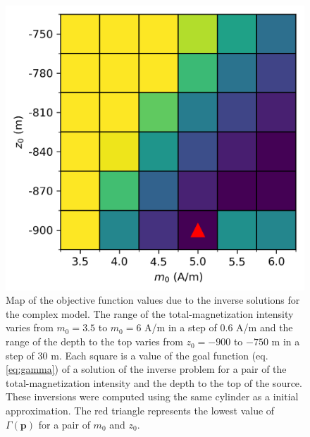\begin{figure}
	\centering
	\includegraphics[scale=.75]{figures/anitapolis_goal_func_grid.png}
	\caption{Map of the objective function values due to the inverse solutions for the complex model. The range of the total-magnetization intensity varies from $m_0 = 3.5$ to $m_0=6$ A/m in a step of $0.6$ A/m and the range of the depth to the top  varies from $z_0=-900$ to $-750$ m in a step of $30$ m. Each square is a value of the goal function (eq. \ref{eq:gamma}) of a solution of the inverse problem for a pair of the total-magnetization intensity and the depth to the top of the source. These inversions were computed using the same cylinder as a initial approximation. The red triangle represents the lowest value of $ \Gamma(\mathbf{p}) $ for a pair of $m_0$ and $z_0$.
	}
	\label{fig:real_map}
\end{figure}

